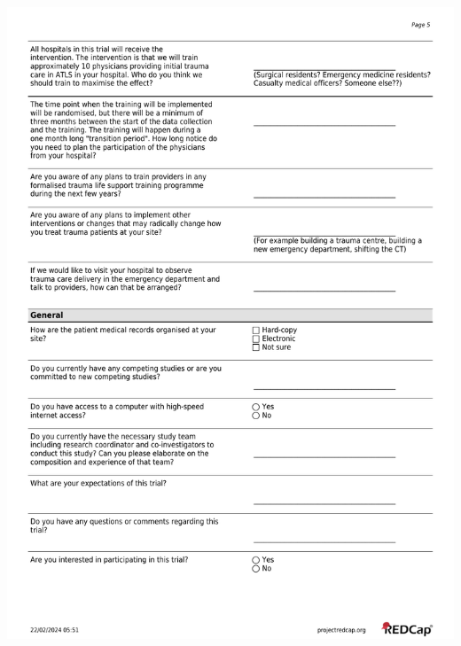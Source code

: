 \documentclass[
]{scrartcl}
\begin{document}
\includegraphics{./appendices/hospital-screening-interview-instrument/hospital-screening-interview-5.pdf}
\end{document}
